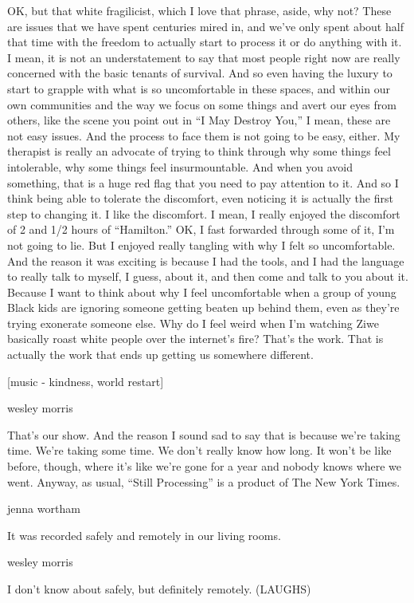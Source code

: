 OK, but that white fragilicist, which I love that phrase, aside, why
not? These are issues that we have spent centuries mired in, and we've
only spent about half that time with the freedom to actually start to
process it or do anything with it. I mean, it is not an understatement
to say that most people right now are really concerned with the basic
tenants of survival. And so even having the luxury to start to grapple
with what is so uncomfortable in these spaces, and within our own
communities and the way we focus on some things and avert our eyes from
others, like the scene you point out in ``I May Destroy You,'' I mean,
these are not easy issues. And the process to face them is not going to
be easy, either. My therapist is really an advocate of trying to think
through why some things feel intolerable, why some things feel
insurmountable. And when you avoid something, that is a huge red flag
that you need to pay attention to it. And so I think being able to
tolerate the discomfort, even noticing it is actually the first step to
changing it. I like the discomfort. I mean, I really enjoyed the
discomfort of 2 and 1/2 hours of ``Hamilton.'' OK, I fast forwarded
through some of it, I'm not going to lie. But I enjoyed really tangling
with why I felt so uncomfortable. And the reason it was exciting is
because I had the tools, and I had the language to really talk to
myself, I guess, about it, and then come and talk to you about it.
Because I want to think about why I feel uncomfortable when a group of
young Black kids are ignoring someone getting beaten up behind them,
even as they're trying exonerate someone else. Why do I feel weird when
I'm watching Ziwe basically roast white people over the internet's fire?
That's the work. That is actually the work that ends up getting us
somewhere different.

{[}music - kindness, world restart{]}

wesley morris

That's our show. And the reason I sound sad to say that is because we're
taking time. We're taking some time. We don't really know how long. It
won't be like before, though, where it's like we're gone for a year and
nobody knows where we went. Anyway, as usual, ``Still Processing'' is a
product of The New York Times.

jenna wortham

It was recorded safely and remotely in our living rooms.

wesley morris

I don't know about safely, but definitely remotely. (LAUGHS)

